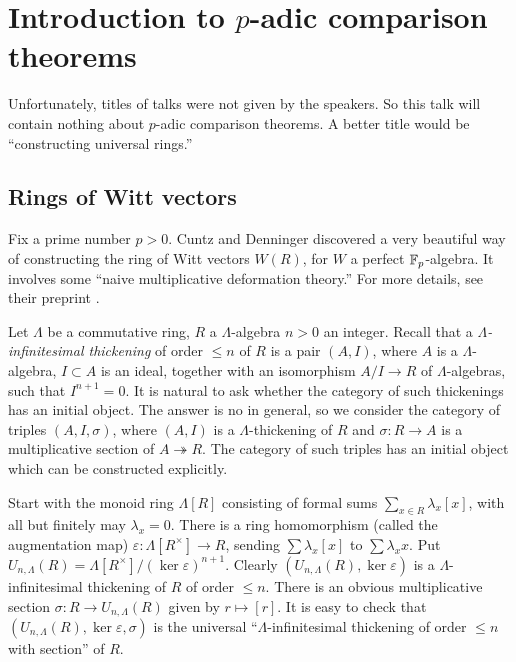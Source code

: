 
\section{Introduction to $p$-adic comparison theorems}




Unfortunately, titles of talks were not given by the speakers. So this talk 
will contain nothing about $p$-adic comparison theorems. A better title would 
be ``constructing universal rings.'' 





\subsection{Rings of Witt vectors}

Fix a prime number $p>0$. Cuntz and Denninger discovered a very beautiful 
way of constructing the ring of Witt vectors $W(R)$, for $W$ a perfect 
$\mathbb{F}_p$-algebra. It involves some ``naive multiplicative deformation theory.'' 
For more details, see their preprint \cite{cd13}. 

Let $\Lambda$ be a commutative ring, $R$ a $\Lambda$-algebra $n>0$ an integer. 
Recall that a \emph{$\Lambda$-infinitesimal thickening} of order 
$\leqslant n$ of $R$ is a pair $(A,I)$, where $A$ is a $\Lambda$-algebra, 
$I\subset A$ is an ideal, together with an isomorphism $A/I\to R$ of 
$\Lambda$-algebras, such that $I^{n+1}=0$. It is natural to ask whether the 
category of such thickenings has an initial object. The answer is no in 
general, so we consider the category of triples $(A,I,\sigma)$, where 
$(A,I)$ is a $\Lambda$-thickening of $R$ and $\sigma:R\to A$ is a 
multiplicative section of $A\twoheadrightarrow R$. The category of such triples 
has an initial object which can be constructed explicitly. 

Start with the monoid ring $\Lambda[R]$ consisting of formal sums 
$\sum_{x\in R} \lambda_x [x]$, with all but finitely may $\lambda_x=0$. 
There is a ring homomorphism (called the augmentation map) 
$\varepsilon:\Lambda[R^\times] \to R$, sending $\sum \lambda_x [x]$ to 
$\sum \lambda_x x$. Put 
$U_{n,\Lambda}(R) = \Lambda[R^\times]/(\ker\varepsilon)^{n+1}$. Clearly 
$(U_{n,\Lambda}(R),\ker\varepsilon)$ is a $\Lambda$-infinitesimal thickening of 
$R$ of order $\leqslant n$. There is an obvious multiplicative section 
$\sigma:R\to U_{n,\Lambda}(R)$ given by $r\mapsto [r]$. It is easy to check 
that $(U_{n,\Lambda}(R),\ker\varepsilon,\sigma)$ is the universal 
``$\Lambda$-infinitesimal thickening of order $\leqslant n$ with section'' of 
$R$. 

